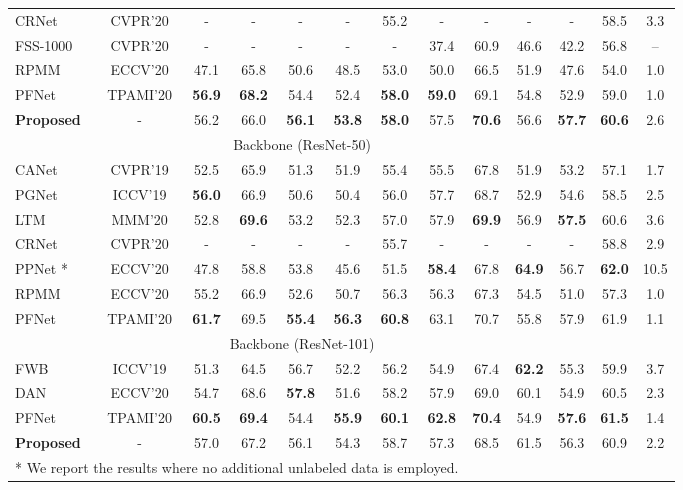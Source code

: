 \documentclass[runningheads]{llncs}
\begin{document}
\begin{table*}[h!]
\begin{center}
\begin{tabular}{l|cccccc|ccccc|c}
CRNet \cite{liu2020crnet} & CVPR'20 & - & - & - & - & 55.2 & - & - & - & - & 58.5 & 3.3  \\
FSS-1000 \cite{wei2019fss} & CVPR'20 &- & - & - & - & - & 37.4 & 60.9 & 46.6 & 42.2 & 56.8 & --  \\
RPMM \cite{liu2020part} & ECCV'20 &47.1 & 65.8 & 50.6 & 48.5 & 53.0 & 50.0&  66.5 & 51.9 & 47.6 & 54.0 & 1.0\\
PFNet \cite{tian2020prior} & TPAMI'20 & \bf 56.9 & \bf 68.2 & 54.4 & 52.4 & \bf 58.0 & \bf 59.0 & 69.1 & 54.8 & 52.9 & 59.0 & 1.0 \\
\bf Proposed & - & 56.2 & 66.0 & \textbf{56.1} & \textbf{53.8} & \textbf{58.0} & 57.5 & \textbf{70.6} & 56.6 & \textbf{57.7} & \textbf{60.6} & 2.6\\
\midrule
& \multicolumn{8}{c}{Backbone (ResNet-50)}       \\
 \midrule
 CANet  \cite{zhang2019canet} & CVPR'19 &52.5 & 65.9 & 51.3 & 51.9 &  55.4 & 55.5 & 67.8 & 51.9 & 53.2  & 57.1 & 1.7 \\
PGNet \cite{zhang2019pyramid}  & ICCV'19 & \bf 56.0 & 66.9 & 50.6 & 50.4 &  56.0 & 57.7 & 68.7 & 52.9 & 54.6  & 58.5 & 2.5 \\
LTM \cite{yang2020new} & MMM'20 &52.8 & \bf 69.6 & 53.2 &  52.3 &  57.0 &  57.9 & \bf 69.9 & 56.9 & \bf 57.5 & 60.6 & 3.6\\
CRNet \cite{liu2020crnet} & CVPR'20 & - & - & - & - & 55.7 & - & - & - & - & 58.8 & 2.9  \\
PPNet \cite{liu2020part}* & ECCV'20 &47.8 & 58.8 & 53.8 & 45.6 & 51.5 & \bf 58.4 & 67.8 & \bf 64.9 &56.7 & \bf 62.0 & 10.5  \\
RPMM \cite{yang2020prototype}& ECCV'20 &55.2 & 66.9 & 52.6 & 50.7 & 56.3 & 56.3 & 67.3 &  54.5 & 51.0 & 57.3 & 1.0 \\
PFNet \cite{tian2020prior} & TPAMI'20 & \bf 61.7 &  69.5 & \bf 55.4 & \bf 56.3 & \bf 60.8 & 63.1 & 70.7 & 55.8& 57.9 & 61.9 & 1.1\\
  \midrule
& \multicolumn{8}{c}{Backbone (ResNet-101)}       \\
 \midrule
FWB \cite{nguyen2019feature} & ICCV'19 &51.3 & 64.5 & 56.7 & 52.2 & 56.2 & 54.9 & 67.4 & \bf 62.2 & 55.3 & 59.9 & 3.7  \\
DAN \cite{wangfew} & ECCV'20 &54.7 &  68.6 & \bf 57.8 & 51.6 & 58.2 & 57.9 &  69.0 & 60.1 & 54.9 & 60.5 & 2.3  \\
PFNet \cite{tian2020prior} & TPAMI'20 & \bf 60.5 & \bf 69.4 & 54.4 & \bf 55.9 & \bf 60.1 & \bf 62.8 & \bf 70.4 & 54.9 & \bf 57.6 & \bf 61.5 & 1.4 \\
\bf Proposed  & - & 57.0 & 67.2 & 56.1 & 54.3 & 58.7 & 57.3& 68.5 & 61.5 &   56.3 & 60.9 & 2.2\\

\hline
\multicolumn{8}{l}{\scriptsize{* We report the results where no additional unlabeled data is employed.}}\\
\end{tabular}
\label{table:pascal5}
\end{center}
\vspace{-6mm}
\end{table*}
\end{document}
